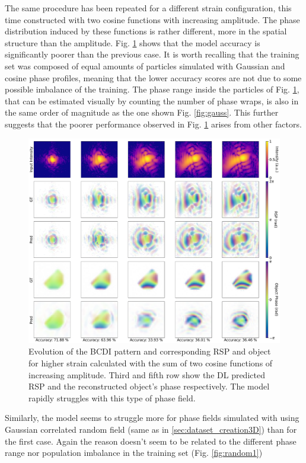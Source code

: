 The same procedure has been repeated for a different strain configuration, this time constructed with two cosine functions 
with increasing amplitude. The phase distribution induced by these functions is rather different, more in the spatial 
structure than the amplitude. Fig. \ref{fig:cosine} shows that the model accuracy is significantly 
poorer than the previous case. It is worth recalling that the training set was composed of equal amounts of particles 
simulated with Gaussian and cosine phase profiles, meaning that the lower accuracy scores are not due to some possible 
imbalance of the training. The phase range inside the particles of Fig. \ref{fig:cosine}, that can be estimated visually 
by counting the number of phase wraps, is also in the same order of magnitude as the one shown Fig. \ref{fig:gauss}. 
This further suggests that the poorer performance observed in Fig. \ref{fig:cosine} arises from other factors.

\begin{figure}[H]
    \centering
    \includegraphics[width=\textwidth]{figures/Phasing/performance_cosine.pdf}
    \caption{Evolution of the BCDI pattern and corresponding RSP and object for higher strain calculated with the sum of 
    two cosine functions of increasing amplitude. Third and fifth row show the DL predicted RSP and the reconstructed 
    object's phase respectively. The model rapidly struggles with this type of phase field.}
    \label{fig:cosine}
\end{figure}

Similarly, the model seems to struggle more for phase fields simulated with using Gaussian correlated random field (same as
in \ref{sec:dataset_creation3D}) than for the first case. Again the reason doesn't seem to be related to the different 
phase range nor population imbalance in the training set (Fig. \ref{fig:random1})

